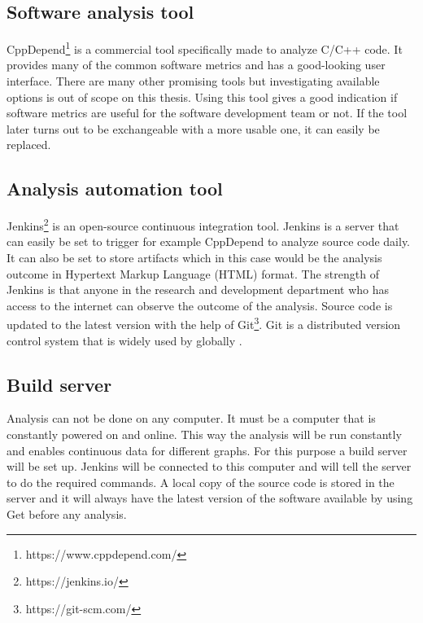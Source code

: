 \subsection{Software analysis tool}
\label{chap:sofanatool}

CppDepend\footnote{https://www.cppdepend.com/} is a commercial tool specifically made to analyze C/C++ code. It provides many of the common software metrics and has a good-looking user interface. There are many other promising tools but investigating available options is out of scope on this thesis. Using this tool gives a good indication if software metrics are useful for the software development team or not. If the tool later turns out to be exchangeable with a more usable one, it can easily be replaced.

\subsection{Analysis automation tool}

Jenkins\footnote{https://jenkins.io/} is an open-source continuous integration tool. Jenkins is a server that can easily be set to trigger for example CppDepend to analyze source code daily. It can also be set to store artifacts which in this case would be the analysis outcome in Hypertext Markup Language (HTML) format.  The strength of Jenkins is that anyone in the research and development department who has access to the internet can observe the outcome of the analysis. Source code is updated to the latest version with the help of Git\footnote{https://git-scm.com/}. Git is a distributed version control system that is widely used by globally \cite{gitsurvey}.

\subsection{Build server}

Analysis can not be done on any computer. It must be a computer that is constantly powered on and online. This way the analysis will be run constantly and enables continuous data for different graphs. For this purpose a build server will be set up. Jenkins will be connected to this computer and will tell the server to do the required commands. A local copy of the source code is stored in the server and it will always have the latest version of the software available by using Get before any analysis.

